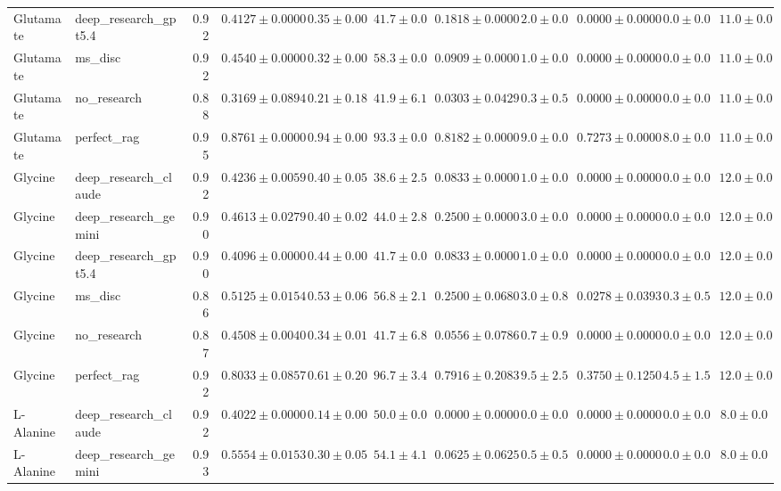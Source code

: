 \begin{table}[htbp]
\begin{tabular}{llrrrrrrrrr}
Glutamate & deep_research_gpt5.4 & 0.92 & $0.4127 \pm 0.0000$ & $0.35 \pm 0.00$ & $41.7 \pm 0.0$ & $0.1818 \pm 0.0000$ & $2.0 \pm 0.0$ & $0.0000 \pm 0.0000$ & $0.0 \pm 0.0$ & $11.0 \pm 0.0$ \\
Glutamate & ms_disc & 0.92 & $0.4540 \pm 0.0000$ & $0.32 \pm 0.00$ & $58.3 \pm 0.0$ & $0.0909 \pm 0.0000$ & $1.0 \pm 0.0$ & $0.0000 \pm 0.0000$ & $0.0 \pm 0.0$ & $11.0 \pm 0.0$ \\
Glutamate & no_research & 0.88 & \cellcolor{red!25}$0.3169 \pm 0.0894$ & $0.21 \pm 0.18$ & $41.9 \pm 6.1$ & $0.0303 \pm 0.0429$ & $0.3 \pm 0.5$ & $0.0000 \pm 0.0000$ & $0.0 \pm 0.0$ & $11.0 \pm 0.0$ \\
Glutamate & perfect_rag & 0.95 & \cellcolor{green!25}$0.8761 \pm 0.0000$ & $0.94 \pm 0.00$ & $93.3 \pm 0.0$ & $0.8182 \pm 0.0000$ & $9.0 \pm 0.0$ & $0.7273 \pm 0.0000$ & $8.0 \pm 0.0$ & $11.0 \pm 0.0$ \\
\midrule
Glycine & deep_research_claude & 0.92 & $0.4236 \pm 0.0059$ & $0.40 \pm 0.05$ & $38.6 \pm 2.5$ & $0.0833 \pm 0.0000$ & $1.0 \pm 0.0$ & $0.0000 \pm 0.0000$ & $0.0 \pm 0.0$ & $12.0 \pm 0.0$ \\
Glycine & deep_research_gemini & 0.90 & $0.4613 \pm 0.0279$ & $0.40 \pm 0.02$ & $44.0 \pm 2.8$ & $0.2500 \pm 0.0000$ & $3.0 \pm 0.0$ & $0.0000 \pm 0.0000$ & $0.0 \pm 0.0$ & $12.0 \pm 0.0$ \\
Glycine & deep_research_gpt5.4 & 0.90 & \cellcolor{red!25}$0.4096 \pm 0.0000$ & $0.44 \pm 0.00$ & $41.7 \pm 0.0$ & $0.0833 \pm 0.0000$ & $1.0 \pm 0.0$ & $0.0000 \pm 0.0000$ & $0.0 \pm 0.0$ & $12.0 \pm 0.0$ \\
Glycine & ms_disc & 0.86 & $0.5125 \pm 0.0154$ & $0.53 \pm 0.06$ & $56.8 \pm 2.1$ & $0.2500 \pm 0.0680$ & $3.0 \pm 0.8$ & $0.0278 \pm 0.0393$ & $0.3 \pm 0.5$ & $12.0 \pm 0.0$ \\
Glycine & no_research & 0.87 & $0.4508 \pm 0.0040$ & $0.34 \pm 0.01$ & $41.7 \pm 6.8$ & $0.0556 \pm 0.0786$ & $0.7 \pm 0.9$ & $0.0000 \pm 0.0000$ & $0.0 \pm 0.0$ & $12.0 \pm 0.0$ \\
Glycine & perfect_rag & 0.92 & \cellcolor{green!25}$0.8033 \pm 0.0857$ & $0.61 \pm 0.20$ & $96.7 \pm 3.4$ & $0.7916 \pm 0.2083$ & $9.5 \pm 2.5$ & $0.3750 \pm 0.1250$ & $4.5 \pm 1.5$ & $12.0 \pm 0.0$ \\
\midrule
L-Alanine & deep_research_claude & 0.92 & $0.4022 \pm 0.0000$ & $0.14 \pm 0.00$ & $50.0 \pm 0.0$ & $0.0000 \pm 0.0000$ & $0.0 \pm 0.0$ & $0.0000 \pm 0.0000$ & $0.0 \pm 0.0$ & $8.0 \pm 0.0$ \\
L-Alanine & deep_research_gemini & 0.93 & $0.5554 \pm 0.0153$ & $0.30 \pm 0.05$ & $54.1 \pm 4.1$ & $0.0625 \pm 0.0625$ & $0.5 \pm 0.5$ & $0.0000 \pm 0.0000$ & $0.0 \pm 0.0$ & $8.0 \pm 0.0$ \\

\end{tabular}
\end{table}
